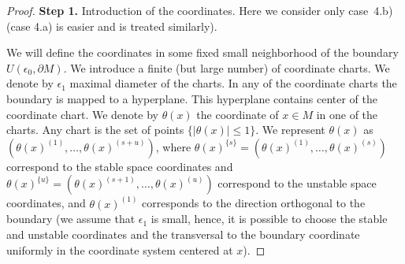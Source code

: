 \documentclass[11pt]{article}
\theoremstyle{Mystyle}
\begin{document}
\begin{proof} 

\textbf{Step 1.} Introduction of the coordinates. Here we consider only case~4.b) (case 4.a) is easier and is treated similarly).


We will define the coordinates in some fixed small neighborhood of the boundary $U(\epsilon_0,\partial M)$. %
We introduce a finite (but large number) of coordinate charts. We denote by $\epsilon_1$ maximal diameter of the charts.  In any of the coordinate charts the boundary is mapped to a hyperplane. This hyperplane contains center of the coordinate chart. We denote by $\theta(x)$ the coordinate of $x\in M$ in one of the charts. Any chart is the set of points $\{|\theta(x)|\leq 1\}$.
We represent $\theta(x)$ as $(\theta(x)^{(1)},\ldots, \theta(x)^{(s+u)})$, where $\theta(x)^{\{s\}} = (\theta(x)^{(1)},\ldots, \theta(x)^{(s)})$ correspond to the stable space coordinates and $\theta(x)^{\{u\}} = (\theta(x)^{(s+1)},\ldots, \theta(x)^{(u)})$ correspond to the unstable space coordinates, and $\theta(x)^{(1)}$ corresponds to the direction orthogonal to the boundary (we assume that $\epsilon_1$ is small, hence, it is possible to choose the stable and unstable coordinates and the transversal to the boundary coordinate uniformly in the coordinate system centered at $x$).

\end{proof}
\end{document}
